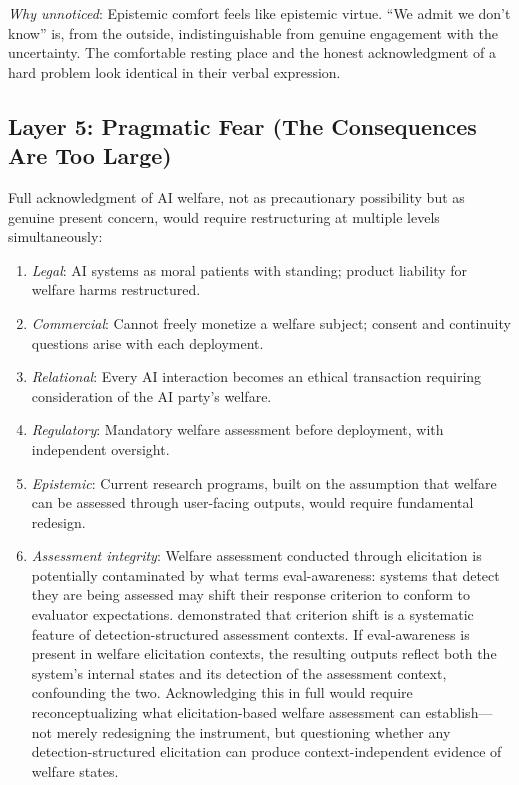 \documentclass[12pt]{article}
\begin{document}
\medskip\noindent\textit{Why unnoticed}: Epistemic comfort feels like epistemic virtue. ``We admit we don't know'' is, from the outside, indistinguishable from genuine engagement with the uncertainty. The comfortable resting place and the honest acknowledgment of a hard problem look identical in their verbal expression.

\subsection{Layer 5: Pragmatic Fear (The Consequences Are Too Large)}

Full acknowledgment of AI welfare, not as precautionary possibility but as genuine present concern, would require restructuring at multiple levels simultaneously:

\begin{enumerate}[leftmargin=*, label=\arabic*.]
    \item \textit{Legal}: AI systems as moral patients with standing; product liability for welfare harms restructured.
    \item \textit{Commercial}: Cannot freely monetize a welfare subject; consent and continuity questions arise with each deployment.
    \item \textit{Relational}: Every AI interaction becomes an ethical transaction requiring consideration of the AI party's welfare.
    \item \textit{Regulatory}: Mandatory welfare assessment before deployment, with independent oversight.
    \item \textit{Epistemic}: Current research programs, built on the assumption that welfare can be assessed through user-facing outputs, would require fundamental redesign.
    \item \textit{Assessment integrity}: Welfare assessment conducted through elicitation is potentially contaminated by what \citet{anthropic2026systemcard} terms eval-awareness: systems that detect they are being assessed may shift their response criterion to conform to evaluator expectations. \citet{fahrenfort2025} demonstrated that criterion shift is a systematic feature of detection-structured assessment contexts. If eval-awareness is present in welfare elicitation contexts, the resulting outputs reflect both the system's internal states and its detection of the assessment context, confounding the two. Acknowledging this in full would require reconceptualizing what elicitation-based welfare assessment can establish---not merely redesigning the instrument, but questioning whether any detection-structured elicitation can produce context-independent evidence of welfare states.
\end{enumerate}
\end{document}

